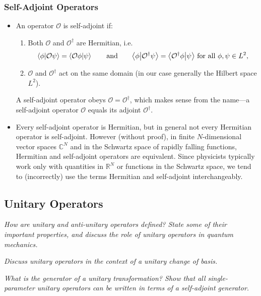 \documentclass[11pt, a4paper]{article}
\newcommand{\eqtext}[1]{\qquad \text{#1} \qquad}
\newcommand{\Herm}{Hermitian\xspace}
\renewcommand{\O}{\mathcal{O}}  %
\newcommand{\p}{\psi}  %
\newcommand{\bbraket}[2]{\big \langle {#1} \big | {#2} \big \rangle}  %
\begin{document}
\subsubsection{Self-Adjoint Operators}
\begin{itemize}
	\item An operator $ \O $ is self-adjoint if:
	\begin{enumerate}
		\item Both $ \O $ and $ \O^{\dagger} $ are Hermitian, i.e.
		\begin{equation*}
			\braket{\phi}{\O \p} = \braket{\O\phi}{\p} \eqtext{and} \bbraket{\phi}{\O^{\dagger} \p} = \bbraket{\O^{\dagger}\phi}{\p} \ \text{for all } \phi, \p \in L^{2},
		\end{equation*}
		
		\item $ \O $ and $ \O^{\dagger} $ act on the same domain (in our case generally the Hilbert space $ L^{2} $).
	\end{enumerate} 
	A self-adjoint operator obeys $ \O = \O^{\dagger} $, which makes sense from the name---a self-adjoint operator $ \O $ equals its adjoint $ \O^{\dagger} $.
	
	\item Every self-adjoint operator is \Herm, but in general not every \Herm operator is self-adjoint. However (without proof), in finite $ N $-dimensional vector spaces $ \mathbb{C}^{N} $ and in the Schwartz space of rapidly falling functions, \Herm and self-adjoint operators are equivalent. Since physicists typically work only with quantities in $ \mathbb{R}^{N} $ or functions in the Schwartz space, we tend to (incorrectly) use the terms Hermitian and self-adjoint interchangeably.

\end{itemize}


\subsection{Unitary Operators}
\textit{How are unitary and anti-unitary operators defined? State some of their important properties, and discuss the role of unitary operators in quantum mechanics.}

\vspace{2mm}
\textit{Discuss unitary operators in the context of a unitary change of basis.}

\vspace{2mm}
\textit{What is the generator of a unitary transformation? Show that all single-parameter unitary operators can be written in terms of a self-adjoint generator.}
\end{document}
